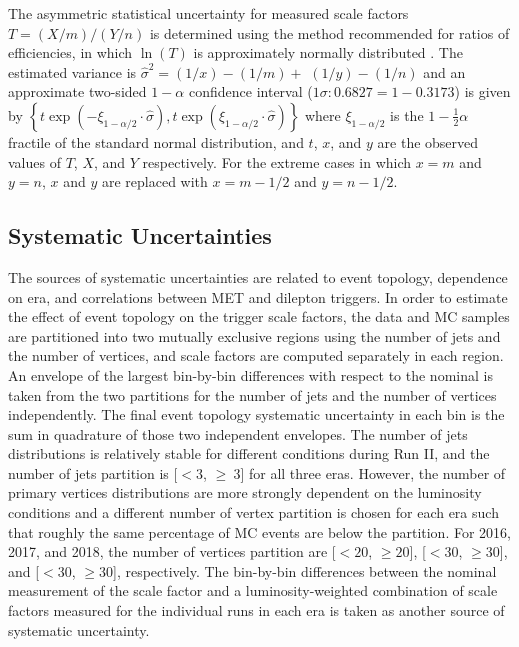 The asymmetric statistical uncertainty for measured scale factors $T=(X / m) /(Y / n)$ is determined using the method recommended for ratios of efficiencies, in which $\ln (T)$ is approximately normally distributed \cite{bib:10.2307/2531405}. 
The estimated variance is  $\hat{\sigma}^{2}=(1 / x)-(1 / m)+$ $(1 / y)-(1 / n)$ and an approximate two-sided $1 - \alpha$ confidence interval ($1 \sigma: 0.6827 = 1 - 0.3173$) is given by $\left\{t \exp \left(-\xi_{1-\alpha / 2} \cdot \hat{\sigma}\right), t \exp \left(\xi_{1-\alpha / 2} \cdot \hat{\sigma}\right)\right\}$ where $\xi_{1-\alpha / 2}$ is the $1-\frac{1}{2} \alpha$ fractile of the standard normal distribution, and $t$, $x$, and $y$ are the observed values of $T$, $X$, and $Y$ respectively.  
For the extreme cases in which $x = m$ and $y = n$, $x$ and $y$ are replaced with $x = m - 1/2$ and $y = n - 1/2$.

\subsection{Systematic Uncertainties}
The sources of systematic uncertainties are related to event topology, dependence on era, and correlations between MET and dilepton triggers.
In order to estimate the effect of event topology on the trigger scale factors, the data and MC samples are partitioned into two mutually exclusive regions using the number of jets and the number of vertices, and scale factors are computed separately in each region. 
An envelope of the largest bin-by-bin differences with respect to the nominal is taken from the two partitions for the number of jets and the number of vertices independently.
The final event topology systematic uncertainty in each bin is the sum in quadrature of those two independent envelopes.
The number of jets distributions is relatively stable for different conditions during Run II, and the number of jets partition is [$< 3$, $\geq\ 3$] for all three eras.
However, the number of primary vertices distributions are more strongly dependent on the luminosity conditions and a different number of vertex partition is chosen for each era such that roughly the same percentage of MC events are below the partition.
For 2016, 2017, and 2018, the number of vertices partition are [$< 20$, $\geq 20$], [$< 30$, $\geq 30$], and [$< 30$, $\geq 30$], respectively.
The bin-by-bin differences between the nominal measurement of the scale factor and a luminosity-weighted combination of scale factors measured for the individual runs in each era is taken as another source of systematic uncertainty.

